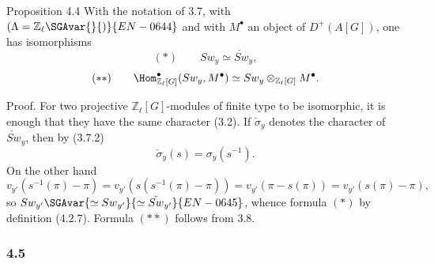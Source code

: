 \begin{statement}{Proposition 4.4}
With the notation of 3.7, with $(\Lambda=\mathbb Z_\ell\SGAvar{}{)}{EN-0644}$ and with $M^\bullet$ an object of $D^+(A[G])$, one has isomorphisms
\[
(*)\qquad Sw_y\simeq \check{Sw}_y,
\]
\[
(**)\qquad
\Hom^\bullet_{\mathbb Z_\ell[G]}(Sw_y,M^\bullet)
\simeq Sw_y\otimes_{\mathbb Z_\ell[G]}M^\bullet.
\]
\end{statement}

Proof. For two projective $\mathbb Z_\ell[G]$-modules of finite type to be isomorphic, it is enough that they have the same character (3.2). If $\check\sigma_y$ denotes the character of $\check{Sw}_y$, then by (3.7.2)
\[
\check\sigma_y(s)=\sigma_y(s^{-1}).
\]
On the other hand
\[
v_{y'}(s^{-1}(\pi)-\pi)
=v_{y'}(s(s^{-1}(\pi)-\pi))
=v_{y'}(\pi-s(\pi))
=v_{y'}(s(\pi)-\pi),
\]
so $Sw_{y'}\SGAvar{\simeq{Sw}_{y'}}{\simeq\check{Sw}_{y'}}{EN-0645}$, whence formula $(*)$ by definition (4.2.7). Formula $(**)$ follows from 3.8.

\subsubsection*{4.5}

